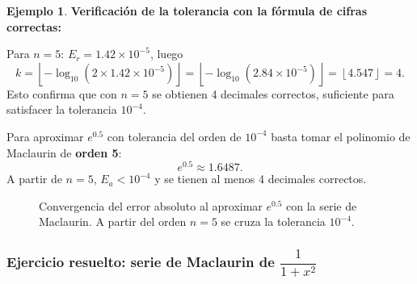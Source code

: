 \documentclass[a4paper,12pt]{article}
\theoremstyle{definition}
\newtheorem{ejemplo}{Ejemplo}[section]
\theoremstyle{plain}
\begin{document}
\begin{ejemplo}
\medskip
\textbf{Verificación de la tolerancia con la fórmula de cifras correctas:}

Para $n = 5$: $E_r = 1.42 \times 10^{-5}$, luego
\[
    k = \left\lfloor -\log_{10}(2 \times 1.42 \times 10^{-5}) \right\rfloor
      = \left\lfloor -\log_{10}(2.84 \times 10^{-5}) \right\rfloor
      = \left\lfloor 4.547 \right\rfloor = 4.
\]
Esto confirma que con $n = 5$ se obtienen 4 decimales correctos, suficiente
para satisfacer la tolerancia $10^{-4}$.
\end{ejemplo}

\begin{cajaresultado}
Para aproximar $e^{0.5}$ con tolerancia del orden de $10^{-4}$ basta tomar
el polinomio de Maclaurin de \textbf{orden 5}:
\[
    e^{0.5} \approx 1.6487.
\]
A partir de $n = 5$, $E_a < 10^{-4}$ y se tienen al menos 4 decimales
correctos.
\end{cajaresultado}

\begin{figure}[H]
\centering
{}
\caption{Convergencia del error absoluto al aproximar $e^{0.5}$ con la serie
de Maclaurin. A partir del orden $n=5$ se cruza la tolerancia $10^{-4}$.}
\end{figure}

\subsubsection{Ejercicio resuelto: serie de Maclaurin de $\dfrac{1}{1+x^2}$}
\end{document}
